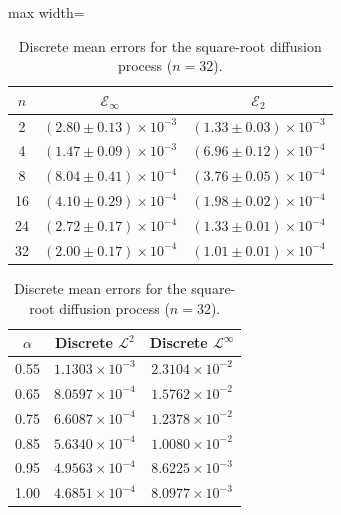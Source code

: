 \documentclass[11pt, a4paper]{article}
\theoremstyle{theoremstyle}
\theoremstyle{definitionstyle}
\begin{document}
\begin{table}[htbp]
    \centering
    \begin{minipage}[t]{0.48\textwidth}
        \centering
        \caption{Trajectory errors $\pm$ resampled Monte Carlo standard error for the square-root diffusion process ($\alpha = 1.0$).}
        \label{tab:sqrt_traj}
        \begin{adjustbox}{max width=\textwidth}
        \begin{tabular}{ccc}
            \toprule
            $n$ & $\mathcal E_\infty$ & $\mathcal E_2$ \\
            \midrule
            2  & $(2.80 \pm 0.13) \times 10^{-3}$ & $(1.33 \pm 0.03) \times 10^{-3}$ \\
            4  & $(1.47 \pm 0.09) \times 10^{-3}$ & $(6.96 \pm 0.12) \times 10^{-4}$ \\
            8  & $(8.04 \pm 0.41) \times 10^{-4}$ & $(3.76 \pm 0.05) \times 10^{-4}$ \\
            16 & $(4.10 \pm 0.29) \times 10^{-4}$ & $(1.98 \pm 0.02) \times 10^{-4}$ \\
            24 & $(2.72 \pm 0.17) \times 10^{-4}$ & $(1.33 \pm 0.01) \times 10^{-4}$ \\
            32 & $(2.00 \pm 0.17) \times 10^{-4}$ & $(1.01 \pm 0.01) \times 10^{-4}$ \\
            \bottomrule
        \end{tabular}
        \end{adjustbox}
    \end{minipage}
    \hfill
    \begin{minipage}[t]{0.48\textwidth}
        \centering
        \caption{Discrete mean errors for the square-root diffusion process ($n = 32$).}
        \label{tab:sqrt_mean}
        \begin{tabular}{ccc}
            \toprule
            $\alpha$ & Discrete $\mathcal L^2$ & Discrete $\mathcal L^\infty$ \\
            \midrule
            0.55 & $1.1303 \times 10^{-3}$ & $2.3104 \times 10^{-2}$ \\
            0.65 & $8.0597 \times 10^{-4}$ & $1.5762 \times 10^{-2}$ \\
            0.75 & $6.6087 \times 10^{-4}$ & $1.2378 \times 10^{-2}$ \\
            0.85 & $5.6340 \times 10^{-4}$ & $1.0080 \times 10^{-2}$ \\
            0.95 & $4.9563 \times 10^{-4}$ & $8.6225 \times 10^{-3}$ \\
            1.00 & $4.6851 \times 10^{-4}$ & $8.0977 \times 10^{-3}$ \\
            \bottomrule
        \end{tabular}
    \end{minipage}
\end{table}
\end{document}

